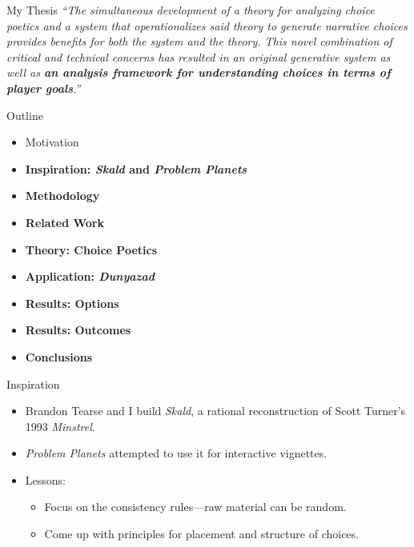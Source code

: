 \documentclass[xcolor=x11names]{beamer}
\def\dunyazad/{\textit{Dunyazad}}
\def\minstrel/{\textit{Minstrel}}
\def\skald/{\textit{Skald}}
\def\problemplanets/{\textit{Problem Planets}}
\begin{document}
\begin{frame}{My Thesis}
  \justifying
  \itshape
  ``The simultaneous development of a theory for analyzing choice poetics and a system that operationalizes said theory to generate narrative choices provides benefits for both the system and the theory. This novel combination of critical and technical concerns has resulted in an original generative system as well as \textbf{an analysis framework for understanding choices in terms of player goals}.''
\end{frame}

\begin{frame}{Outline}
  \begin{itemize}
    \item Motivation
    \item \textbf{Inspiration: \skald/ and \problemplanets/}
    \item \textbf{Methodology}
    \item \textbf{Related Work}
    \item \textbf{Theory: Choice Poetics}
    \item \textbf{Application: \dunyazad/}
    \item \textbf{Results: Options}
    \item \textbf{Results: Outcomes}
    \item \textbf{Conclusions}
  \end{itemize}
\end{frame}

\begin{frame}{Inspiration}
  \vfill
  \begin{itemize}\addtolength{\itemsep}{0.5\baselineskip}
    \item Brandon Tearse and I build \skald/, a rational reconstruction of Scott Turner's 1993 \minstrel/.
    \item \problemplanets/ attempted to use it for interactive vignettes.
    \item Lessons:
    \begin{itemize}\addtolength{\itemsep}{0.5\baselineskip}
      \vspace{0.5\baselineskip}
      \item Focus on the consistency rules---raw material can be random.
      \item Come up with principles for placement and structure of choices.
    \end{itemize}
  \end{itemize}
  \vfill
  \centering
  \tiny
   \\
\end{frame}
\end{document}
